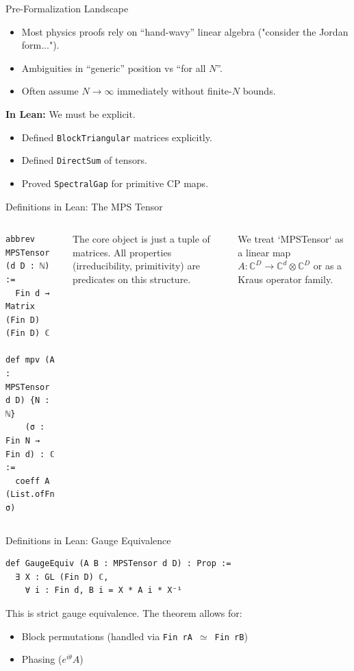 \documentclass[aspectratio=169,10pt]{beamer}
\begin{document}
\begin{frame}{Pre-Formalization Landscape}
    \begin{itemize}
        \item Most physics proofs rely on ``hand-wavy'' linear algebra ("consider the Jordan form...").
        \item Ambiguities in ``generic'' position vs ``for all $N$''.
        \item Often assume $N \to \infty$ immediately without finite-$N$ bounds.
    \end{itemize}

    \textbf{In Lean:}
    We must be explicit.
    \begin{itemize}
        \item Defined \texttt{BlockTriangular} matrices explicitly.
        \item Defined \texttt{DirectSum} of tensors.
        \item Proved \texttt{SpectralGap} for primitive CP maps.
    \end{itemize}
\end{frame}

\begin{frame}[fragile]{Definitions in Lean: The MPS Tensor}
    \begin{columns}
        \begin{lstlisting}[language=Lean]
abbrev MPSTensor (d D : ℕ) :=
  Fin d → Matrix (Fin D) (Fin D) ℂ

def mpv (A : MPSTensor d D) {N : ℕ}
    (σ : Fin N → Fin d) : ℂ :=
  coeff A (List.ofFn σ)
        \end{lstlisting}
        
        \vspace{0.5em}
        The core object is just a tuple of matrices.
        All properties (irreducibility, primitivity) are predicates on this structure.
        
        \textcolor{dimwhite}{
            We treat `MPSTensor` as a linear map
            $A: \mathbb{C}^D \to \mathbb{C}^d \otimes \mathbb{C}^D$
            or as a Kraus operator family.
        }
    \end{columns}
\end{frame}

\begin{frame}[fragile]{Definitions in Lean: Gauge Equivalence}
    \begin{lstlisting}[language=Lean]
def GaugeEquiv (A B : MPSTensor d D) : Prop :=
  ∃ X : GL (Fin D) ℂ,
    ∀ i : Fin d, B i = X * A i * X⁻¹
    \end{lstlisting}

    \vspace{1em}
    This is strict gauge equivalence. The theorem allows for:
    \begin{itemize}
        \item Block permutations (handled via \texttt{Fin rA}~$\simeq$~\texttt{Fin rB})
        \item Phasing ($e^{i\theta} A$)
    \end{itemize}
\end{frame}
\end{document}
